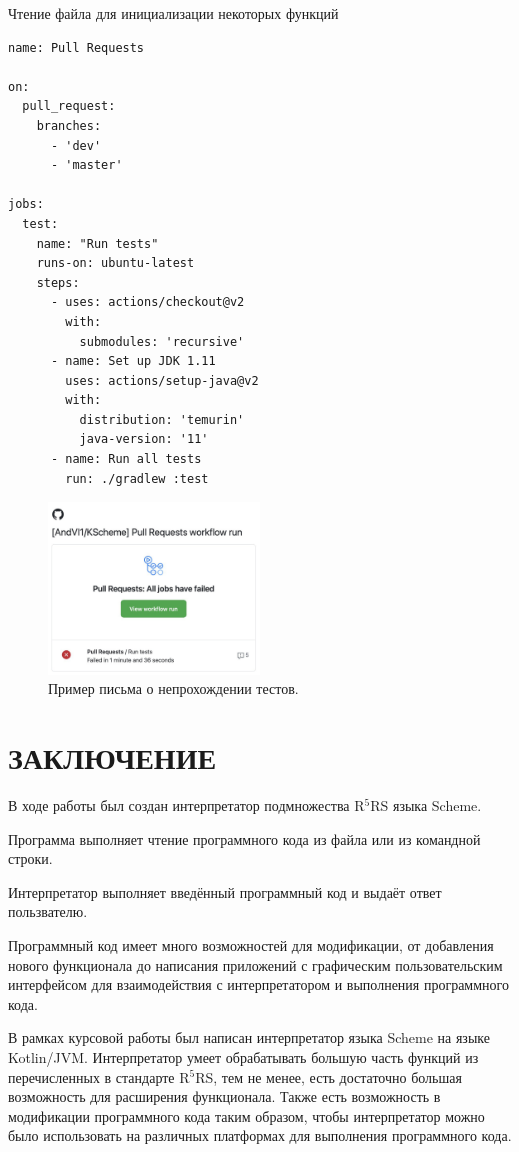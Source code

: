 \documentclass[14pt, russian]{scrartcl}
\newcommand{\anonsection}[1]{\cleardoublepage
\phantomsection
\addcontentsline{toc}{section}{\protect\numberline{}#1}
\section*{#1}\vspace*{2.5ex} %
}
\begin{document}
\begin{listing}[!htb]
\caption{Чтение файла для инициализации некоторых функций}
\label{lst:githubaction}
\begin{verbatim}
name: Pull Requests

on:
  pull_request:
    branches:
      - 'dev'
      - 'master'

jobs:
  test:
    name: "Run tests"
    runs-on: ubuntu-latest
    steps:
      - uses: actions/checkout@v2
        with:
          submodules: 'recursive'
      - name: Set up JDK 1.11
        uses: actions/setup-java@v2
        with:
          distribution: 'temurin'
          java-version: '11'
      - name: Run all tests
        run: ./gradlew :test
\end{verbatim}
\end{listing}

\begin{figure}[!htb]\centering
\includegraphics[width=0.5\textwidth]{fail.jpg}
\caption{Пример письма о непрохождении тестов.}
\label{fig::fail}
\end{figure}

 \anonsection{ЗАКЛЮЧЕНИЕ} %

В ходе работы был создан интерпретатор подмножества R$^5$RS языка Scheme.

Программа выполняет чтение программного кода из файла или из командной строки.

Интерпретатор выполняет введённый программный код и выдаёт ответ пользвателю.

Программный код имеет много возможностей для модификации, от добавления нового функционала до написания приложений с графическим пользовательским интерфейсом для взаимодействия с интерпретатором и выполнения программного кода.

В рамках курсовой работы был написан интерпретатор языка Scheme на языке Kotlin/JVM. Интерпретатор умеет обрабатывать большую часть функций из перечисленных в стандарте R$^5$RS, тем не менее, есть достаточно большая возможность для расширения функционала.
Также есть возможность в модификации программного кода таким образом, чтобы интерпретатор можно было использовать на различных платформах для выполнения программного кода.
\end{document}

